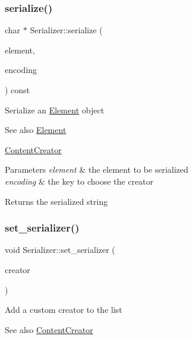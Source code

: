 \subsubsection{\texorpdfstring{serialize()}{serialize()}\hspace{0.1cm}{\footnotesize\ttfamily [2/2]}}
{\footnotesize\ttfamily char $\ast$ Serializer\+::serialize (\begin{DoxyParamCaption}\item[{\mbox{\hyperlink{classElement}{Element}} $\ast$}]{element,  }\item[{const char $\ast$}]{encoding }\end{DoxyParamCaption}) const\hspace{0.3cm}{\ttfamily [virtual]}}

Serialize an \mbox{\hyperlink{classElement}{Element}} object \begin{DoxySeeAlso}{See also}
\mbox{\hyperlink{classElement}{Element}} 

\mbox{\hyperlink{classContentCreator}{Content\+Creator}}
\end{DoxySeeAlso}

\begin{DoxyParams}{Parameters}
{\em element} & the element to be serialized \\
\hline
{\em encoding} & the key to choose the creator \\
\hline
\end{DoxyParams}
\begin{DoxyReturn}{Returns}
the serialized string 
\end{DoxyReturn}
\mbox{\label{classSerializer_aee483f1845ca1b7f7ac4243de9902750}} 
\subsubsection{\texorpdfstring{set\+\_\+serializer()}{set\_serializer()}}
{\footnotesize\ttfamily void Serializer\+::set\+\_\+serializer (\begin{DoxyParamCaption}\item[{\mbox{\hyperlink{classContentCreator}{Content\+Creator}} $\ast$}]{creator }\end{DoxyParamCaption})}

Add a custom creator to the list \begin{DoxySeeAlso}{See also}
\mbox{\hyperlink{classContentCreator}{Content\+Creator}}
\end{DoxySeeAlso}

